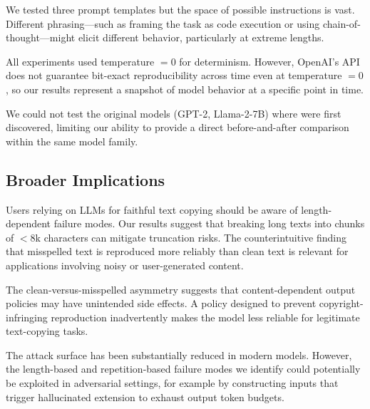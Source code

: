 We tested three prompt templates but the space of possible instructions is vast. Different phrasing---such as framing the task as code execution or using chain-of-thought---might elicit different behavior, particularly at extreme lengths.

All experiments used temperature $= 0$ for determinism. However, OpenAI's API does not guarantee bit-exact reproducibility across time even at temperature $= 0$, so our results represent a snapshot of model behavior at a specific point in time.

We could not test the original models (GPT-2, Llama-2-7B) where \glitchtokens were first discovered, limiting our ability to provide a direct before-and-after comparison within the same model family.

\subsection{Broader Implications}

Users relying on LLMs for faithful text copying should be aware of length-dependent failure modes. Our results suggest that breaking long texts into chunks of $<$8k characters can mitigate truncation risks. The counterintuitive finding that misspelled text is reproduced more reliably than clean text is relevant for applications involving noisy or user-generated content.

The clean-versus-misspelled asymmetry suggests that content-dependent output policies may have unintended side effects. A policy designed to prevent copyright-infringing reproduction inadvertently makes the model less reliable for legitimate text-copying tasks.

The \glitchtoken attack surface has been substantially reduced in modern models. However, the length-based and repetition-based failure modes we identify could potentially be exploited in adversarial settings, for example by constructing inputs that trigger hallucinated extension to exhaust output token budgets.
